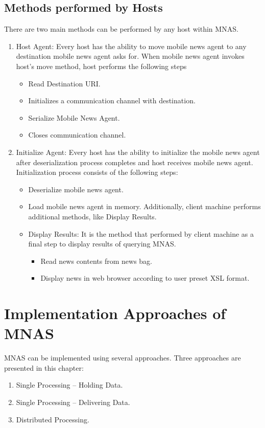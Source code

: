 \documentclass[12pt,a4paper,final,twoside,onecolumn,titlepage]{book}
\begin{document}
\subsection{Methods performed by Hosts}
There are two main methods can be performed by any host within \gls{MNAS}.
\begin{enumerate}
\item Host Agent: Every host has the ability to move mobile news agent to any destination mobile news agent asks for. When mobile news agent invokes host's move method, host performs the following steps
\begin{itemize}
\item Read Destination URI.
\item Initializes a communication channel with destination.
\item Serialize Mobile News Agent.
\item Closes communication channel.
\end{itemize}
\item Initialize Agent: Every host has the ability to initialize the mobile news agent after deserialization process completes and host receives mobile news agent. Initialization process consists of the following steps:
\begin{itemize}
\item Deserialize mobile news agent.
\item Load mobile news agent in memory.
Additionally, client machine performs additional methods, like Display Results.
\item Display Results: It is the method that performed by client machine as a final step to display results of querying \gls{MNAS}.
\begin{itemize}
\item Read news contents from news bag.
\item Display news in web browser according to user preset XSL format.
\end{itemize}
\end{itemize}
\end{enumerate}

\section{Implementation Approaches of MNAS}
\gls{MNAS} can be implemented using several approaches. Three approaches are presented in this chapter:
\begin{enumerate}
\item Single Processing – Holding Data.
\item Single Processing – Delivering Data.
\item Distributed Processing.
\end{enumerate}
\end{document}
